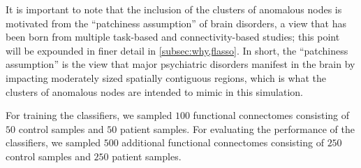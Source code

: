 It is important to note that the inclusion of the clusters of anomalous nodes is motivated from the ``patchiness assumption'' of brain disorders, a view that has been born from multiple task-based and connectivity-based studies; this point will be expounded in finer detail in \ref{subsec:why,flasso}.
In short, the ``patchiness assumption'' is the view that major psychiatric disorders manifest in the brain by impacting moderately sized spatially contiguous regions,  which is what the clusters of anomalous nodes are intended to mimic in this simulation.

For training the classifiers, we sampled $100$ functional connectomes consisting of $50$ control samples and $50$ patient samples. 
For evaluating the performance of the classifiers, we sampled $500$ additional functional connectomes consisting of $250$ control samples and $250$ patient samples.
